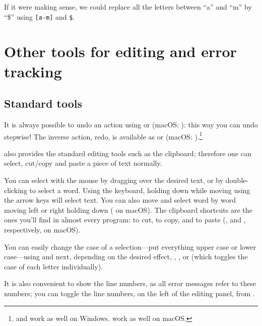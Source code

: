If it were making sense, we could replace all the letters between ``a'' and ``m'' by ``\$'' using {\frq\verb+[a-m]+\flq} and {\frq\verb+$+\flq}.

\section{Other tools for editing and error tracking}

\subsection{Standard tools}

It is always possible to undo an action using \submenu{} or  (macOS: ): this way you can undo stepwise! The inverse action, redo, is available as \submenu{} or  (macOS: ).\footnote{ and  work as well on Windows.  work as well on macOS.}

{\Tw} also provides the standard editing tools such as the clipboard; therefore one can select, cut/copy and paste a piece of text normally.

You can select with the mouse by dragging over the desired text, or by  double-clicking to select a word. Using the keyboard, holding down  while moving using the arrow keys will select text. You can also move and select word by word moving left or right holding  down ( on macOS). The clipboard shortcuts are the ones you'll find in almost every program:  to cut,  to copy, and  to paste (,  and , respectively, on macOS).

You can easily change the case of a selection---put everything upper case or lower case---using \submenu{} and next, depending on the desired effect, , , or  (which toggles the case of each letter individually).

It is also convenient to show the line numbers, as all error messages refer to these numbers; you can toggle the line numbers, on the left of the editing panel, from \submenu{}.

